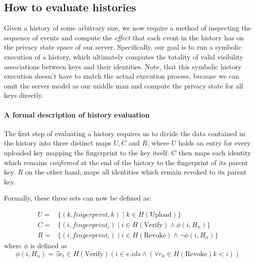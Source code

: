 \subsection{How to evaluate histories}
Given a history of some arbitrary size, we now require a method of inspecting the sequence of events and compute the \emph{effect} that each event in the history has on the privacy state space of our server. 
Specifically, our goal is to run a symbolic execution of a history, which ultimately computes the totality of valid visibility associations between keys and their identities. Note, that this symbolic history execution doesn't have to match the actual execution process, because we can omit the server model as our middle man and compute the privacy state for all keys directly.

\paragraph{A formal description of history evaluation}
\label{sec:history_def}
The first step of evaluating a history requires us to divide the data contained in the history into three distinct maps \(U,C\) and \(R\), where \(U\) holds an entry for every uploaded key mapping the fingerprint to the key itself. \(C\) then maps each identity which remains \emph{confirmed} at the end of the history to the fingerprint of its parent key. \(R\) on the other hand, maps all identities which remain revoked to its parent key.

Formally, these three sets can now be defined as: 

\begin{equation}
    \begin{aligned}
        U =& \{(k.fingerprint,k)  \mid k \in H(\text{Upload}) \} \\
        C =& \{(i, fingerprint_i) \mid i \in H(\text{Verify}) \wedge \phi(i, H_n) \} \\
        R =& \{(i, fingerprint_i) \mid i \in H(\text{Revoke}) \wedge \neg \phi(i,H_n)\}
    \end{aligned}
\end{equation}
   where \(\phi\) is defined as 
\begin{equation}
    \phi(i,H_n) = \exists e_t\in H(\text{Verify}) ( i \in e.ids \wedge (\forall e_k \in H(\text{Revoke}) k < i  ))
\end{equation}
 

